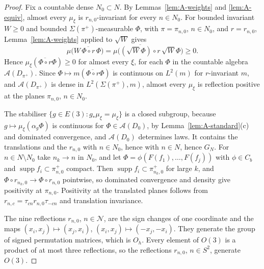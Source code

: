 \documentclass[11pt]{amsart}
\theoremstyle{plain}
\theoremstyle{definition}
\theoremstyle{remark}
\numberwithin{equation}{section}
\newcommand{\cA}{\mathcal{A}}
\newcommand{\cN}{\mathcal{N}}
\newcommand{\Oh}{O_h}
\newcommand{\Eu}{E(3)}
\DeclareMathOperator{\supp}{supp}
\begin{document}
\begin{proof}
Fix a countable dense $N_0\subset N$. By Lemmas~\ref{lem:A-weights} and \ref{lem:A-equiv}, almost every $\mu_\xi$ is $r_{n,0}$-invariant for every $n\in N_0$. For bounded invariant $W\ge0$ and bounded $\Sigma(\pi^+)$-measurable $\Phi$, with $\pi=\pi_{n,0}$, $n\in N_0$, and $r=r_{n,0}$, Lemma~\ref{lem:A-weights} applied to $\sqrt W$ gives
\[
\mu\big(W\,\overline{\Phi\circ r}\,\Phi\big)=\mu\big(\overline{(\sqrt W\Phi)\circ r}\,\sqrt W\Phi\big)\ge0 .
\]
Hence $\mu_\xi(\overline{\Phi\circ r}\Phi)\ge0$ for almost every $\xi$, for each $\Phi$ in the countable algebra $\cA(D_{\pi^+})$. Since $\Phi\mapsto m(\overline{\Phi\circ r}\Phi)$ is continuous on $L^2(m)$ for $r$-invariant $m$, and $\cA(D_{\pi^+})$ is dense in $L^2(\Sigma(\pi^+),m)$, almost every $\mu_\xi$ is reflection positive at the planes $\pi_{n,0}$, $n\in N_0$.

The stabiliser $\{g\in\Eu:g_*\mu_\xi=\mu_\xi\}$ is a closed subgroup, because $g\mapsto\mu_\xi(\alpha_g\Phi)$ is continuous for $\Phi\in\cA(D_0)$, by Lemma~\ref{lem:A-standard}(c) and dominated convergence, and $\cA(D_0)$ determines laws. It contains the translations and the $r_{n,0}$ with $n\in N_0$, hence with $n\in N$, hence $G_N$. For $n\in N\setminus N_0$ take $n_k\to n$ in $N_0$, and let $\Phi=\phi(F(f_1),\dots,F(f_j))$ with $\phi\in C_b$ and $\supp f_i\subset\pi^+_{n,0}$ compact. Then $\supp f_i\subset\pi^+_{n_k,0}$ for large $k$, and $\Phi\circ r_{n_k,0}\to\Phi\circ r_{n,0}$ pointwise, so dominated convergence and density give positivity at $\pi_{n,0}$. Positivity at the translated planes follows from $r_{n,c}=\tau_{cn}r_{n,0}\tau_{-cn}$ and translation invariance.

The nine reflections $r_{n,0}$, $n\in\cN$, are the sign changes of one coordinate and the maps $(x_i,x_j)\mapsto(x_j,x_i)$, $(x_i,x_j)\mapsto(-x_j,-x_i)$. They generate the group of signed permutation matrices, which is $\Oh$. Every element of $O(3)$ is a product of at most three reflections, so the reflections $r_{n,0}$, $n\in S^2$, generate $O(3)$.
\end{proof}
\end{document}
